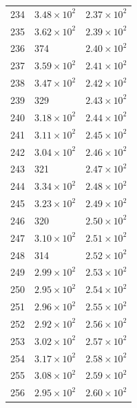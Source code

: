 \begin{table}[H]
\begin{tabular}{lll}
234 & $\displaystyle 3.48 \times 10^{2}$ & $\displaystyle 2.37 \times 10^{2}$ \\
235 & $\displaystyle 3.62 \times 10^{2}$ & $\displaystyle 2.39 \times 10^{2}$ \\
236 & 374 & $\displaystyle 2.40 \times 10^{2}$ \\
237 & $\displaystyle 3.59 \times 10^{2}$ & $\displaystyle 2.41 \times 10^{2}$ \\
238 & $\displaystyle 3.47 \times 10^{2}$ & $\displaystyle 2.42 \times 10^{2}$ \\
239 & 329 & $\displaystyle 2.43 \times 10^{2}$ \\
240 & $\displaystyle 3.18 \times 10^{2}$ & $\displaystyle 2.44 \times 10^{2}$ \\
241 & $\displaystyle 3.11 \times 10^{2}$ & $\displaystyle 2.45 \times 10^{2}$ \\
242 & $\displaystyle 3.04 \times 10^{2}$ & $\displaystyle 2.46 \times 10^{2}$ \\
243 & 321 & $\displaystyle 2.47 \times 10^{2}$ \\
244 & $\displaystyle 3.34 \times 10^{2}$ & $\displaystyle 2.48 \times 10^{2}$ \\
245 & $\displaystyle 3.23 \times 10^{2}$ & $\displaystyle 2.49 \times 10^{2}$ \\
246 & 320 & $\displaystyle 2.50 \times 10^{2}$ \\
247 & $\displaystyle 3.10 \times 10^{2}$ & $\displaystyle 2.51 \times 10^{2}$ \\
248 & 314 & $\displaystyle 2.52 \times 10^{2}$ \\
249 & $\displaystyle 2.99 \times 10^{2}$ & $\displaystyle 2.53 \times 10^{2}$ \\
250 & $\displaystyle 2.95 \times 10^{2}$ & $\displaystyle 2.54 \times 10^{2}$ \\
251 & $\displaystyle 2.96 \times 10^{2}$ & $\displaystyle 2.55 \times 10^{2}$ \\
252 & $\displaystyle 2.92 \times 10^{2}$ & $\displaystyle 2.56 \times 10^{2}$ \\
253 & $\displaystyle 3.02 \times 10^{2}$ & $\displaystyle 2.57 \times 10^{2}$ \\
254 & $\displaystyle 3.17 \times 10^{2}$ & $\displaystyle 2.58 \times 10^{2}$ \\
255 & $\displaystyle 3.08 \times 10^{2}$ & $\displaystyle 2.59 \times 10^{2}$ \\
256 & $\displaystyle 2.95 \times 10^{2}$ & $\displaystyle 2.60 \times 10^{2}$ \\

\end{tabular}
\end{table}
